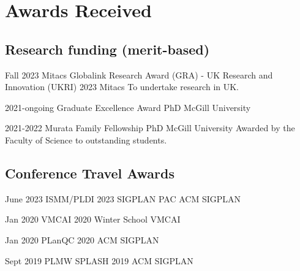 \section{Awards Received}

    \subsection{Research funding (merit-based)}
    
    \cventry
        {Fall 2023}
        {Mitacs Globalink Research Award (GRA) - UK Research and Innovation (UKRI) 2023}
        {Mitacs}
        {}
        {}
        {
            To undertake research in UK.
        }

    \cventry
        {2021-ongoing}
        {Graduate Excellence Award}
        {PhD}
        {McGill University}
        {}
        {}

    \cventry
        {2021-2022}
        {Murata Family Fellowship}
        {PhD}
        {McGill University}
        {}
        {
            Awarded by the Faculty of Science to outstanding students.
        }

    \subsection{Conference Travel Awards}

    \cventry
        {June 2023}
        {ISMM/PLDI 2023 SIGPLAN PAC}
        {ACM SIGPLAN}
        {}
        {}
        {}

    \cventry
        {Jan 2020}
        {VMCAI 2020 Winter School}
        {VMCAI}
        {}
        {}
        {}
    
    \cventry
        {Jan 2020}
        {PLanQC 2020}
        {ACM SIGPLAN}
        {}
        {}
        {}

    \cventry
        {Sept 2019}
        {PLMW SPLASH 2019}
        {ACM SIGPLAN}
        {}
        {}
        {}

    
    
    